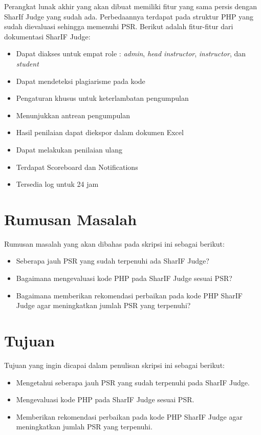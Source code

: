 Perangkat lunak akhir yang akan dibuat memiliki fitur yang sama persis dengan SharIf Judge yang sudah ada. Perbedaannya terdapat pada struktur PHP yang sudah dievaluasi sehingga memenuhi PSR. Berikut adalah fitur-fitur dari dokumentasi SharIF Judge:
\begin{itemize}
	\item Dapat diakses untuk empat role : \textit{admin}, \textit{head instructor}, \textit{instructor}, dan \textit{student}
	\item Dapat mendeteksi plagiarisme pada kode
	\item Pengaturan khusus untuk keterlambatan pengumpulan
	\item Menunjukkan antrean pengumpulan
	\item Hasil penilaian dapat diekspor dalam dokumen Excel
	\item Dapat melakukan penilaian ulang
	\item Terdapat Scoreboard dan Notifications
	\item Tersedia log untuk 24 jam 
\end{itemize}


\section{Rumusan Masalah}
\label{sec:rumusan}
Rumusan masalah yang akan dibahas pada skripsi ini sebagai berikut:
\begin{itemize}
	\item Seberapa jauh PSR yang sudah terpenuhi ada SharIF Judge?
	\item Bagaimana mengevaluasi kode PHP pada SharIF Judge sesuai PSR?  
	\item Bagaimana memberikan rekomendasi perbaikan pada kode PHP SharIF Judge agar meningkatkan jumlah PSR yang terpenuhi?
\end{itemize}


\section{Tujuan}
\label{sec:tujuan}
Tujuan yang ingin dicapai dalam penulisan skripsi ini sebagai berikut:
\begin{itemize}
	\item Mengetahui seberapa jauh PSR yang sudah terpenuhi pada SharIF Judge.
	\item Mengevaluasi kode PHP pada SharIF Judge sesuai PSR.
	\item Memberikan rekomendasi perbaikan pada kode PHP SharIF Judge agar meningkatkan jumlah PSR yang terpenuhi.
\end{itemize}


